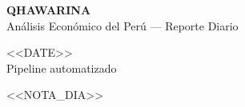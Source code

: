 \documentclass[10pt,a4paper]{article}
\begin{document}
\thispagestyle{empty}

\begin{tcolorbox}[
  enhanced,
  colback=terra,
  colframe=terra,
  boxrule=0pt,
  arc=0pt,
  left=10pt, right=10pt, top=8pt, bottom=8pt,
  width=\textwidth,
]
  \begin{minipage}[c]{0.55\textwidth}
    {\fontsize{18}{20}\selectfont\bfseries\color{white}QHAWARINA}\\[2pt]
    {\small\color{white!80!terra}Análisis Económico del Perú — Reporte Diario}
  \end{minipage}%
  \begin{minipage}[c]{0.44\textwidth}
    \raggedleft
    {\large\color{white}<<DATE>>}\\[2pt]
    {\small\color{white!80!terra}Pipeline automatizado}
  \end{minipage}
\end{tcolorbox}

\vspace{0.8em}

\begin{notabox}
  \small\color{ink}<<NOTA_DIA>>
\end{notabox}

\vspace{0.8em}
\end{document}
